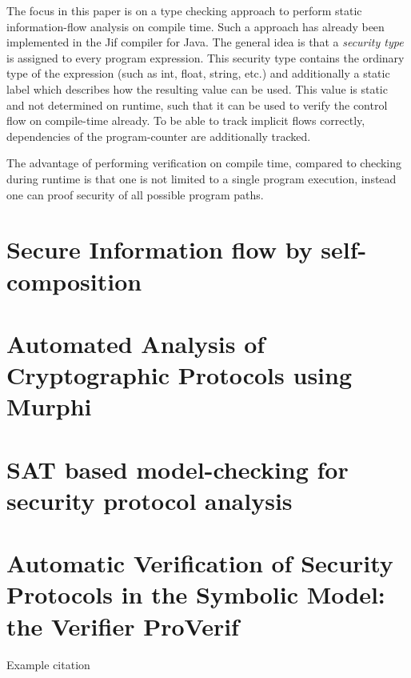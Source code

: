 \documentclass[a4paper,UKenglish]{lipics-v2018}
\begin{document}
The focus in this paper is on a type checking approach to perform static information-flow analysis on compile time. Such a approach has already been implemented in the Jif compiler for Java.\cite{JFlow} The general idea is that a \textit{security type} is assigned to every program expression. This security type contains the ordinary type of the expression (such as int, float, string, etc.) and additionally a static label which describes how the resulting value can be used. This value is static and not determined on runtime, such that it can be used to verify the control flow on compile-time already.\cite{language_based_information_flow_security}
To be able to track implicit flows correctly, dependencies of the program-counter are additionally tracked.

The advantage of performing verification on compile time, compared to checking during runtime is that one is not limited to a single program execution, instead one can proof security of all possible program paths.\cite{language_based_information_flow_security}




\newpage
\section{Secure Information flow by self-composition}



\newpage
\section{Automated Analysis of Cryptographic Protocols using Murphi}



\newpage
\section{SAT based model-checking for security protocol analysis}



\newpage
\section{Automatic Verification of Security Protocols in the Symbolic Model: the Verifier ProVerif}
Example citation \cite{ProVerif}




\end{document}
